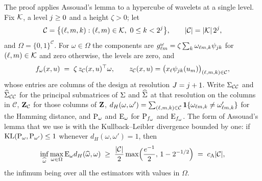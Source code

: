 The proof applies Assouad's lemma to a hypercube of wavelets at a single
level. Fix $\mathcal{K}$, a level $j \ge 0$ and a height $\zeta > 0$; let
\[
  \mathcal{C} = \bigl\{(\ell,m,k) : (\ell,m)\in\mathcal{K},\ 0 \le k < 2^{j}\bigr\},
  \qquad |\mathcal{C}| = |\mathcal{K}|\,2^{j},
\]
and $\Omega = \{0,1\}^{\mathcal{C}}$. For $\omega \in \Omega$ the components
are $g_{\ell m}^{\omega} =
\zeta\sum_{k}\omega_{\ell m,k}\psi_{jk}$ for
$(\ell,m) \in \mathcal{K}$ and zero otherwise, the levels are zero, and
\[
  f_{\omega}(x,u) \;=\; \zeta\,z_{\mathcal{C}}(x,u)^{\top}\omega,
  \qquad
  z_{\mathcal{C}}(x,u) = \bigl(x_{\ell}\psi_{jk}(u_{m})\bigr)_{(\ell,m,k)\in\mathcal{C}} ,
\]
whose entries are columns of the design at resolution $J = j + 1$. Write
$\Sigma_{\mathcal{C}\mathcal{C}}$ and $\widehat{\Sigma}_{\mathcal{C}\mathcal{C}}$ for
the principal submatrices of $\Sigma$ and $\widehat{\Sigma}$ at that resolution on the
columns in $\mathcal{C}$, $\mathbf{Z}_{\mathcal{C}}$ for those columns of $\mathbf{Z}$,
$d_{H}(\omega,\omega') = \sum_{(\ell,m,k)\in\mathcal{C}}
\mathbf{1}\{\omega_{\ell m,k} \ne \omega'_{\ell m,k}\}$ for the Hamming
distance, and $\mathrm{P}_{\omega}$ and $\mathrm{E}_{\omega}$ for $\mathrm{P}_{f_{\omega}}$ and
$\mathrm{E}_{f_{\omega}}$. The form of Assouad's lemma that we use is
\citet[Theorem~2.12(iv)]{Tsybakov-2009} with the Kullback--Leibler divergence
bounded by one: if $\operatorname{KL}(\mathrm{P}_{\omega},\mathrm{P}_{\omega'}) \le 1$
whenever $d_{H}(\omega,\omega') = 1$, then
\begin{equation}
  \label{eq:assouad}
  \inf_{\widehat\omega}\max_{\omega\in\Omega}\mathrm{E}_{\omega}d_{H}(\widehat\omega,\omega)
  \;\ge\; \frac{|\mathcal{C}|}{2}\max\Bigl(\frac{e^{-1}}{2},\,1-2^{-1/2}\Bigr)
  \;=\; c_{\mathrm{A}}|\mathcal{C}| ,
\end{equation}
the infimum being over all the estimators with values in $\Omega$.

